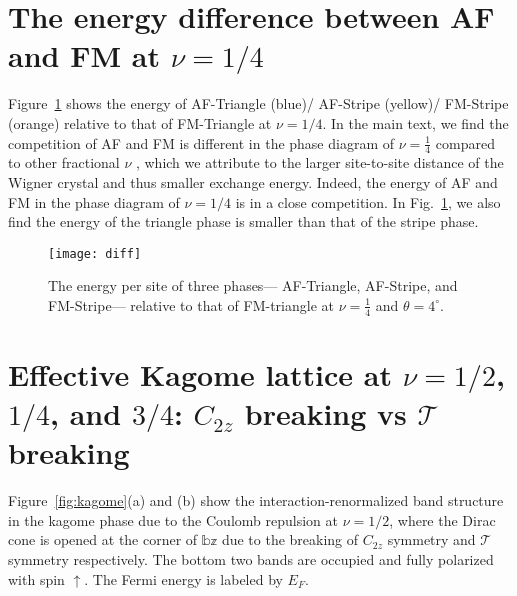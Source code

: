 \documentclass[aps,prl,floatfix,twocolumn]{revtex4-1}
\begin{document}
\section{The energy difference between AF and FM at $ \nu=1/4 $}
Figure~\ref{fig:diff} shows the energy of AF-Triangle (blue)/ AF-Stripe (yellow)/ FM-Stripe (orange) relative to that of FM-Triangle at $\nu=1/4$. In the main text, we find the competition of AF and FM is different in the phase diagram of $ \nu=\frac{1}{4} $ compared to other fractional $\nu$ , which we attribute to the larger site-to-site distance of the Wigner crystal and thus smaller exchange energy. Indeed, the energy of AF and FM in the phase diagram of $ \nu=1/4 $ is in a close competition. In Fig.~\ref{fig:diff}, we also find the energy of the triangle phase is smaller than that of the stripe phase.
\begin{figure}[t]
	\centering
	\texttt{[image: diff]}
	\caption{The energy per site of three phases--- AF-Triangle, AF-Stripe, and FM-Stripe--- relative to that of FM-triangle at $ \nu=\frac{1}{4} $ and $ \theta=4^\circ $.}
	\label{fig:diff}
\end{figure}


\section{Effective Kagome lattice at $ \nu=1/2 $, $ 1/4 $, and $ 3/4 $: $ C_{2z} $ breaking vs $\mathcal{T}$ breaking}

Figure~\ref{fig:kagome}(a) and (b) show the interaction-renormalized band structure in the kagome phase due to the Coulomb repulsion at $ \nu=1/2 $, where the Dirac cone is opened at the corner of $ \mathbb{bz} $ due to the breaking of $ C_{2z} $ symmetry and $ \mathcal{T} $ symmetry respectively. The bottom two bands are occupied and fully polarized with spin $\uparrow$. The Fermi energy is labeled by $ E_F $.
\end{document}
